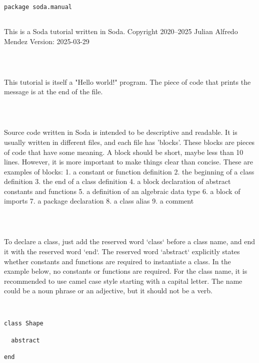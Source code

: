 \documentclass[12pt,a4paper]{article}
\begin{document}
\begin{lstlisting}
package soda.manual


\end{lstlisting}

This is a Soda tutorial written in Soda.
 Copyright 2020--2025 Julian Alfredo Mendez
 Version: 2025-03-29


\begin{lstlisting}



\end{lstlisting}

This tutorial is itself a "Hello world!" program.
 The piece of code that prints the message is at the end of the file.


\begin{lstlisting}



\end{lstlisting}

Source code written in Soda is intended to be descriptive and readable.
 It is usually written in different files, and each file has 'blocks'.
 These blocks are pieces of code that have some meaning.
 A block should be short, maybe less than 10 lines.
 However, it is more important to make things clear than concise.
 These are examples of blocks:
 1. a constant or function definition
 2. the beginning of a class definition
 3. the end of a class definition
 4. a block declaration of abstract constants and functions
 5. a definition of an algebraic data type
 6. a block of imports
 7. a package declaration
 8. a class alias
 9. a comment


\begin{lstlisting}



\end{lstlisting}

To declare a class, just add the reserved word `class` before a class name, and end it with
 the reserved word `end`.
 The reserved word `abstract` explicitly states whether constants and functions are required
 to instantiate a class. In the example below, no constants or functions are required.
 For the class name, it is recommended to use camel case style starting with a capital letter.
 The name could be a noun phrase or an adjective, but it should not be a verb.


\begin{lstlisting}


class Shape

  abstract

end


\end{lstlisting}
\end{document}
